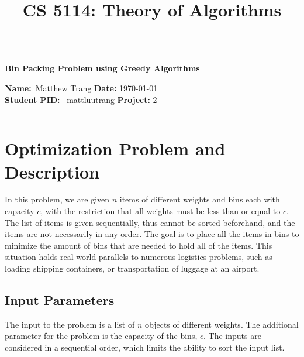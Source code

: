 \documentclass[11pt]{article}
\title{CS 5114: Theory of Algorithms}
\begin{document}


\begin{center}
	\hrule
	\vspace{.4cm}
	{\textbf { \large Bin Packing Problem using Greedy Algorithms}}
\end{center}
\textbf{Name:}\ Matthew Trang \hspace{\fill} \textbf{Date:} \today \\
{ \textbf{Student PID:}} \ mattluutrang \hspace{\fill} \textbf{Project: } 2
\vspace{.4cm}
\hrule


\section{Optimization Problem and Description}
In this problem, we are given ${n}$ items of different weights and bins each with capacity ${c}$,
with the restriction that all weights must be less than or equal to ${c}$. The list of items is
given sequentially, thus cannot be sorted beforehand, and the items are not necessarily in any
order. The goal is to place all the items in bins to minimize the amount of bins that are needed to
hold all of the items. This situation holds real world parallels to numerous logistics problems, such as loading
shipping containers, or transportation of luggage at an airport.
\subsection{Input Parameters}
The input to the problem is a list of ${n}$ objects of different weights. The additional parameter
for the problem is the capacity of the bins, ${c}$. The inputs are considered in a sequential order,
which limits the ability to sort the input list.
\end{document}
